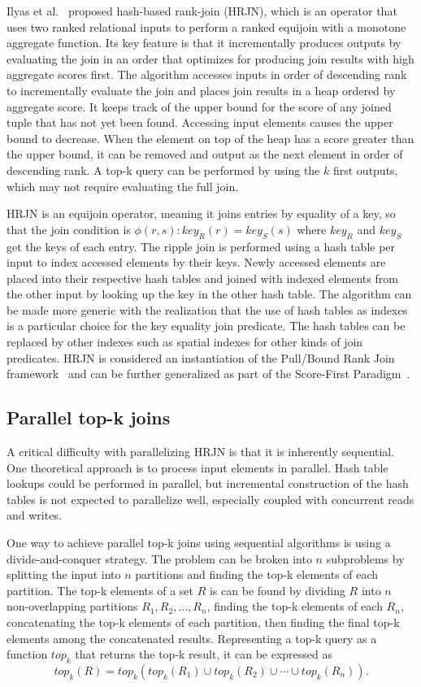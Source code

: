 Ilyas et al.~\cite{ilyas2004supporting} proposed hash-based rank-join (HRJN), which is an operator that uses two ranked relational inputs to perform a ranked equijoin with a monotone aggregate function. Its key feature is that it incrementally produces outputs by evaluating the join in an order that optimizes for producing join results with high aggregate scores first. The algorithm accesses inputs in order of descending rank to incrementally evaluate the join and places join results in a heap ordered by aggregate score. It keeps track of the upper bound for the score of any joined tuple that has not yet been found. Accessing input elements causes the upper bound to decrease. When the element on top of the heap has a score greater than the upper bound, it can be removed and output as the next element in order of descending rank. A top-k query can be performed by using the \(k\) first outputs, which may not require evaluating the full join.

HRJN is an equijoin operator, meaning it joins entries by equality of a key, so that the join condition is \(\phi(r, s) : key_R(r) = key_S(s)\) where \(key_R\) and \(key_S\) get the keys of each entry. The ripple join is performed using a hash table per input to index accessed elements by their keys. Newly accessed elements are placed into their respective hash tables and joined with indexed elements from the other input by looking up the key in the other hash table. The algorithm can be made more generic with the realization that the use of hash tables as indexes is a particular choice for the key equality join predicate. The hash tables can be replaced by other indexes such as spatial indexes for other kinds of join predicates. HRJN is considered an instantiation of the Pull/Bound Rank Join framework~\cite{schnaitter2010optimal} and can be further generalized as part of the Score-First Paradigm~\cite{qi2015efficient}.

\subsection{Parallel top-k joins}

A critical difficulty with parallelizing HRJN is that it is inherently sequential. One theoretical approach is to process input elements in parallel. Hash table lookups could be performed in parallel, but incremental construction of the hash tables is not expected to parallelize well, especially coupled with concurrent reads and writes.

One way to achieve parallel top-k joins using sequential algorithms is using a divide-and-conquer strategy. The problem can be broken into \(n\) subproblems by splitting the input into \(n\) partitions and finding the top-k elements of each partition. The top-k elements of a set \(R\) is can be found by dividing \(R\) into \(n\) non-overlapping partitions \(R_1, R_2, \dotsc, R_n\), finding the top-k elements of each \(R_n\), concatenating the top-k elements of each partition, then finding the final top-k elements among the concatenated results. Representing a top-k query as a function \(top_k\) that returns the top-k result, it can be expressed as
\[
  top_k(R) = top_k(top_k(R_1) \cup top_k(R_2) \cup \cdots \cup top_k(R_n)).
\]

